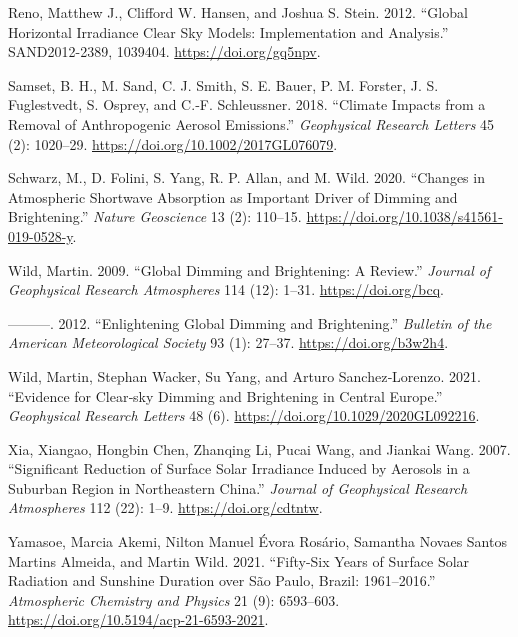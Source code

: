 \documentclass[
  preprint, 3p, authoryear]{article}
\newlength{\cslhangindent}
\newlength{\cslentryspacingunit} %
\newenvironment{CSLReferences}[2] %
 {%
  \setlength{\parindent}{0pt}
  \ifodd #1
  \let\oldpar\par
  \def\par{\hangindent=\cslhangindent\oldpar}
  \fi
  \setlength{\parskip}{#2\cslentryspacingunit}
 }%
 {}
\begin{document}
\begin{CSLReferences}{1}{0}
\leavevmode{}%
Reno, Matthew J., Clifford W. Hansen, and Joshua S. Stein. 2012. {``Global Horizontal Irradiance Clear Sky Models: Implementation and Analysis.''} SAND2012-2389, 1039404. \url{https://doi.org/gq5npv}.

\leavevmode{}%
Samset, B. H., M. Sand, C. J. Smith, S. E. Bauer, P. M. Forster, J. S. Fuglestvedt, S. Osprey, and C.‐F. Schleussner. 2018. {``Climate Impacts from a Removal of Anthropogenic Aerosol Emissions.''} \emph{Geophysical Research Letters} 45 (2): 1020--29. \url{https://doi.org/10.1002/2017GL076079}.

\leavevmode{}%
Schwarz, M., D. Folini, S. Yang, R. P. Allan, and M. Wild. 2020. {``Changes in Atmospheric Shortwave Absorption as Important Driver of Dimming and Brightening.''} \emph{Nature Geoscience} 13 (2): 110--15. \url{https://doi.org/10.1038/s41561-019-0528-y}.

\leavevmode{}%
Wild, Martin. 2009. {``Global Dimming and Brightening: A Review.''} \emph{Journal of Geophysical Research Atmospheres} 114 (12): 1--31. \url{https://doi.org/bcq}.

\leavevmode{}%
---------. 2012. {``Enlightening Global Dimming and Brightening.''} \emph{Bulletin of the American Meteorological Society} 93 (1): 27--37. \url{https://doi.org/b3w2h4}.

\leavevmode{}%
Wild, Martin, Stephan Wacker, Su Yang, and Arturo Sanchez‐Lorenzo. 2021. {``Evidence for Clear‐sky Dimming and Brightening in Central Europe.''} \emph{Geophysical Research Letters} 48 (6). \url{https://doi.org/10.1029/2020GL092216}.

\leavevmode{}%
Xia, Xiangao, Hongbin Chen, Zhanqing Li, Pucai Wang, and Jiankai Wang. 2007. {``Significant Reduction of Surface Solar Irradiance Induced by Aerosols in a Suburban Region in Northeastern China.''} \emph{Journal of Geophysical Research Atmospheres} 112 (22): 1--9. \url{https://doi.org/cdtntw}.

\leavevmode{}%
Yamasoe, Marcia Akemi, Nilton Manuel Évora Rosário, Samantha Novaes Santos Martins Almeida, and Martin Wild. 2021. {``Fifty-Six Years of Surface Solar Radiation and Sunshine Duration over São Paulo, Brazil: 1961--2016.''} \emph{Atmospheric Chemistry and Physics} 21 (9): 6593--603. \url{https://doi.org/10.5194/acp-21-6593-2021}.


\end{CSLReferences}
\end{document}
